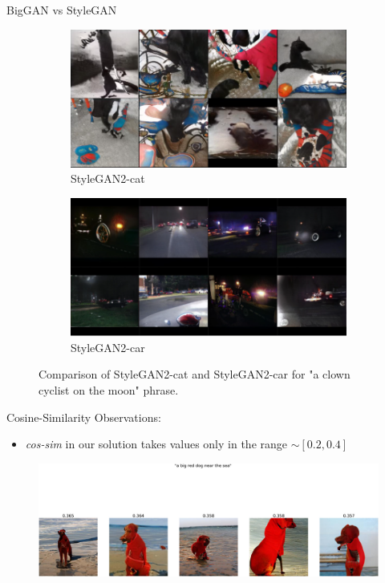 \documentclass[t]{beamer}
\begin{document}
\begin{frame}[c]{BigGAN vs StyleGAN}
\begin{figure}[H]
\centering
\begin{subfigure}[b]{0.6\textwidth}
   \includegraphics[width=1\linewidth]{clown_stylegancat2.PNG}
   \caption{StyleGAN2-cat}
   \label{fig:Ng1} 
\end{subfigure}

\begin{subfigure}[b]{0.6\textwidth}
   \includegraphics[width=1\linewidth]{clown_stylegancar.PNG}
   \caption{StyleGAN2-car}
   \label{fig:Ng2}
\end{subfigure}

\caption[pics]{Comparison of StyleGAN2-cat and StyleGAN2-car for "a clown cyclist on the moon" phrase.}
\end{figure}
\end{frame}

\begin{frame}{Cosine-Similarity}
Observations:
\begin{itemize}
\item \textit{cos-sim} in our solution takes values only in the range $\sim [0.2, 0.4]$
\end{itemize}
\begin{figure}
    \centering
    \includegraphics[scale=0.05]{bigreddog.png}
\end{figure} 
\end{frame}
\end{document}
